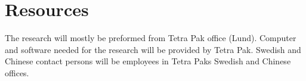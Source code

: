 \documentclass[a4paper, 11pt]{article} %
\begin{document}
\section*{Resources}
The research will mostly be preformed from Tetra Pak office (Lund). Computer and software needed for the research will be provided by Tetra Pak. Swedish and Chinese contact persons will be employees in Tetra Paks Swedish and Chinese offices.




\end{document}
